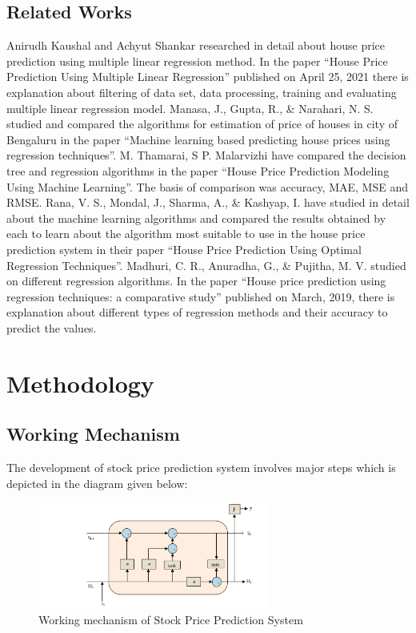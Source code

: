 \section{Related Works}
\vspace{-18pt}
Anirudh Kaushal and Achyut Shankar researched in detail about house price prediction using multiple linear regression method. In the paper “House Price Prediction Using Multiple Linear Regression” published on April 25, 2021 there is explanation about filtering of data set, data processing, training and evaluating multiple linear regression model. \cite{kaushal2021house} Manasa, J., Gupta, R., \& Narahari, N. S. studied and compared the algorithms for estimation of price of houses in city of Bengaluru in the paper “Machine learning based predicting house prices using regression techniques”. \cite{manasa2020machine} M. Thamarai, S P. Malarvizhi have compared the decision tree and regression algorithms in the paper “House Price Prediction Modeling Using Machine Learning”. The basis of comparison was accuracy, MAE, MSE and RMSE. \cite{thamarai2020house} Rana, V. S., Mondal, J., Sharma, A., \& Kashyap, I. have studied in detail about the machine learning algorithms and compared the results obtained by each to learn about the algorithm most suitable to use in the house price prediction system in their paper “House Price Prediction Using Optimal Regression Techniques”.\cite{Rana2020HousePP} Madhuri, C. R., Anuradha, G., \& Pujitha, M. V. studied on different regression algorithms. In the paper “House price prediction using regression techniques: a comparative study” published on March, 2019, there is explanation about different types of regression methods and their accuracy to predict the values. \cite{madhuri2019house}
\chapter{Methodology}
\vspace{-18pt}
  \section{Working Mechanism}
  \vspace{-18pt}
The development of stock price prediction system involves major steps which is 
depicted in the diagram given below:
\begin{figure}[tbh] %
\begin{center}
	\includegraphics[width=3in]{images/fc.jpg} 
	\caption{Working mechanism of Stock Price Prediction System} %
	\label{Working mechanism of Stock Price Prediction System} %
\end{center}
\end{figure}
